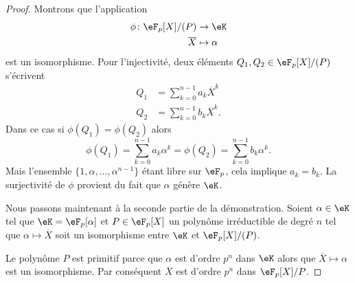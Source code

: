 \begin{proof}
	Montrons que l'application
	\begin{equation}
		\begin{aligned}
			\phi\colon \eF_p[X]/(P) & \to \eK               \\
			\overline        X      & \mapsto \alpha
		\end{aligned}
	\end{equation}
	est un isomorphisme. Pour l'injectivité, deux éléments \( Q_1,Q_2\in \eF_p[X]/(P)\) s'écrivent
	\begin{subequations}
		\begin{align}
			Q_1 & =\sum_{k=0}^{n-1}a_k\overline X^k         \\
			Q_2 & =\sum_{k=0}^{n-1}b_k\overline X^k.
		\end{align}
	\end{subequations}
	Dans ce cas si \( \phi(Q_1)=\phi(Q_2)\) alors
	\begin{equation}
		\phi(Q_1)=\sum_{k=0}^{n-1}a_k\alpha^k=\phi(Q_2)=\sum_{k=0}^{n-1}b_k\alpha^k.
	\end{equation}
	Mais l'ensemble \( \{ 1,\alpha,\ldots, \alpha^{n-1} \}\) étant libre sur \( \eF_p\), cela implique \( a_k=b_k\). La surjectivité de \( \phi\) provient du fait que \( \alpha\) génère \( \eK\).

	Nous passons maintenant à la seconde partie de la démonstration. Soient \( \alpha\in \eK\) tel que \( \eK=\eF_p[\alpha]\) et \( P\in \eF_p[X]\) un polynôme irréductible de degré \( n\) tel que \( \alpha\mapsto \overline X\) soit un isomorphisme entre \( \eK\) et \( \eF_p[X]/(P)\).

	Le polynôme \( P\) est primitif parce que \( \alpha\) est d'ordre \( p^n\) dans \( \eK\) alors que \( \overline X\mapsto \alpha\) est un isomorphisme. Par conséquent \( \overline X\) est d'ordre \( p^n\) dans \( \eF_p[X]/P\).


\end{proof}
